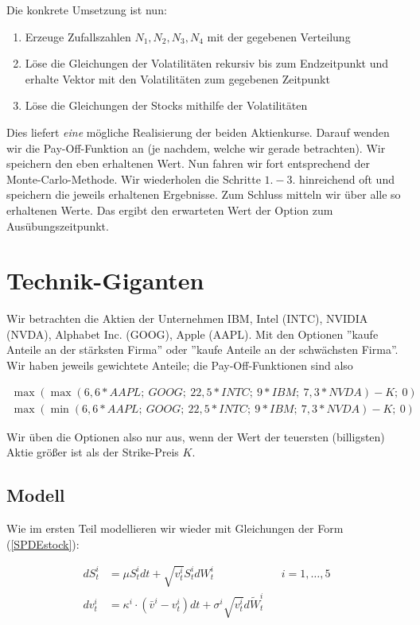 \documentclass[12pt]{article}
\begin{document}
Die konkrete Umsetzung ist nun:
\begin{enumerate}
\item Erzeuge Zufallszahlen $N_1, N_2, N_3, N_4$ mit der gegebenen Verteilung
\item Löse die Gleichungen der Volatilitäten rekursiv bis zum Endzeitpunkt und erhalte Vektor mit den Volatilitäten zum gegebenen Zeitpunkt
\item Löse die Gleichungen der Stocks mithilfe der Volatilitäten
\end{enumerate}

Dies liefert \textit{eine} mögliche Realisierung der beiden Aktienkurse. Darauf wenden wir die Pay-Off-Funktion an (je nachdem, welche wir gerade betrachten). Wir speichern den eben erhaltenen Wert.
Nun fahren wir fort entsprechend der Monte-Carlo-Methode. Wir wiederholen die Schritte $1.-3.$ hinreichend oft und speichern die jeweils erhaltenen Ergebnisse. Zum Schluss mitteln wir über alle so erhaltenen Werte. Das ergibt den erwarteten Wert der Option zum Ausübungszeitpunkt.


\section{Technik-Giganten}

Wir betrachten die Aktien der Unternehmen IBM, Intel (INTC), NVIDIA (NVDA), Alphabet Inc. (GOOG), Apple (AAPL). Mit den Optionen ''kaufe Anteile an der stärksten Firma'' oder ''kaufe Anteile an der schwächsten Firma''. Wir haben jeweils gewichtete Anteile; die Pay-Off-Funktionen sind also

\begin{align*}
\max(\max(6,6\ast AAPL;\ GOOG;\ 22,5\ast INTC;\ 9\ast IBM;\ 7,3\ast NVDA) -K;\ 0) \\
\max(\min(6,6\ast AAPL;\ GOOG;\ 22,5\ast INTC;\ 9\ast IBM;\ 7,3\ast NVDA) -K;\ 0)
\end{align*}

Wir üben die Optionen also nur aus, wenn der Wert der teuersten (billigsten) Aktie größer ist als der Strike-Preis $K$.


\subsection{Modell}

Wie im ersten Teil modellieren wir wieder mit Gleichungen der Form (\ref{SPDEstock}):

\begin{align*}
dS^i_t &= \mu S^i_t dt + \sqrt{v^i_t} S^i_t dW^i_t  && i=1,\dots,5\\
dv^i_t &= \kappa^i\cdot(\bar{v}^i-v^i_t) dt + \sigma^i \sqrt{v^i_t}d\tilde{W}^i_t
\end{align*}
\end{document}
